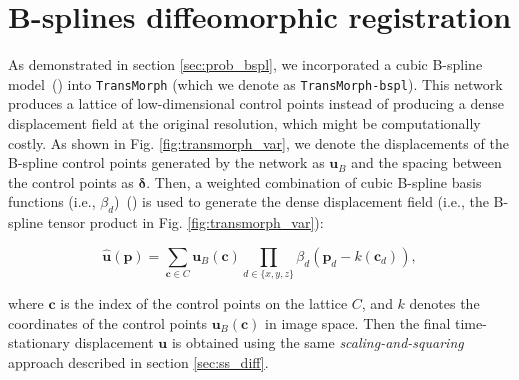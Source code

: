 \documentclass[times,twocolumn,final]{elsarticle}
\begin{document}
\section{B-splines diffeomorphic registration}
\label{sec:bspline_diff}
As demonstrated in section \ref{sec:prob_bspl}, we incorporated a cubic B-spline model~(\cite{qiu2021learning}) into \texttt{TransMorph} (which we denote as \texttt{TransMorph-bspl}). This network produces a lattice of low-dimensional control points instead of producing a dense displacement field at the original resolution, which might be computationally costly. As shown in Fig. \ref{fig:transmorph_var}, we denote the displacements of the B-spline control points generated by the network as $\mathbf{u}_B$ and the spacing between the control points as $\mathbf{\delta}$. Then, a weighted combination of cubic B-spline basis functions (i.e., $\beta_d$)~(\cite{rueckert1999nonrigid}) is used to generate the dense displacement field (i.e., the B-spline tensor product in Fig. \ref{fig:transmorph_var}):
\begin{linenomath}
\begin{equation}
    \hat{\mathbf{u}}(\mathbf{p})=\sum_{\mathbf{c}\in C}\mathbf{u}_{B}(\mathbf{c})\prod_{d\in\{x,y,z\}}\beta_d(\mathbf{p}_d-k(\mathbf{c}_d)),
\end{equation}
\end{linenomath}
where $\mathbf{c}$ is the index of the control points on the lattice $C$, and $k$ denotes the coordinates of the control points $\mathbf{u}_{B}(\mathbf{c})$ in image space. Then the final time-stationary displacement $\mathbf{u}$ is obtained using the same \textit{scaling-and-squaring} approach described in section \ref{sec:ss_diff}.
\end{document}
